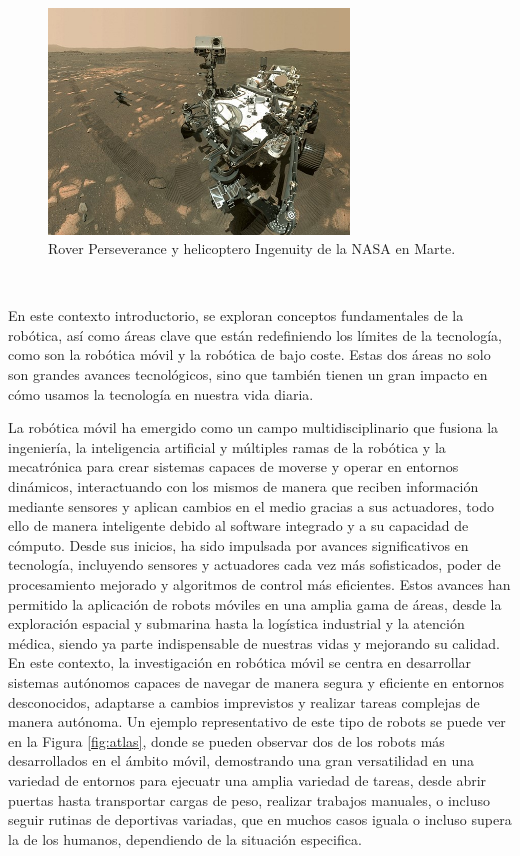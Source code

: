 \begin{figure} [h!]
  \begin{center}
    \includegraphics[width=8cm]{figs/perseverance_and_ingenuity_mars_rover_selfie}
  \end{center}
  \caption{Rover Perseverance y helicoptero Ingenuity de la NASA en Marte.}
  \label{fig:rover}
\end{figure}\

En este contexto introductorio, se exploran conceptos fundamentales de la
robótica, así como áreas clave que están redefiniendo los límites de la
tecnología, como son la robótica móvil y la robótica de bajo coste.
Estas dos áreas no solo son grandes avances tecnológicos, sino que también
tienen un gran impacto en cómo usamos la tecnología en nuestra vida diaria.



La robótica móvil ha emergido como un campo multidisciplinario que fusiona la
ingeniería, la inteligencia artificial y múltiples ramas de la robótica y la
mecatrónica para crear sistemas capaces de moverse y operar en entornos
dinámicos, interactuando con los mismos de manera que reciben información
mediante sensores y aplican cambios en el medio gracias a sus actuadores, todo
ello de manera inteligente debido al software integrado y a su capacidad de
cómputo.
Desde sus inicios, ha sido impulsada por avances significativos en tecnología,
incluyendo sensores y actuadores cada vez más sofisticados, poder de
procesamiento mejorado y algoritmos de control más eficientes.
Estos avances han permitido la aplicación de robots móviles en una amplia gama
de áreas, desde la exploración espacial y submarina hasta la logística
industrial y la atención médica, siendo ya parte indispensable de nuestras vidas
y mejorando su calidad.
En este contexto, la investigación en robótica móvil se centra en desarrollar
sistemas autónomos capaces de navegar de manera segura y eficiente en entornos
desconocidos, adaptarse a cambios imprevistos y realizar tareas complejas de
manera autónoma.
Un ejemplo representativo de este tipo de robots se puede ver en la Figura
\ref{fig:atlas}, donde se pueden observar dos de los robots más desarrollados en
el ámbito móvil, demostrando una gran versatilidad en una variedad de entornos
para ejecuatr una amplia variedad de tareas, desde abrir puertas hasta
transportar cargas de peso, realizar trabajos manuales, o incluso seguir rutinas
de deportivas variadas, que en muchos casos iguala o incluso supera la de los
humanos, dependiendo de la situación especifica.

